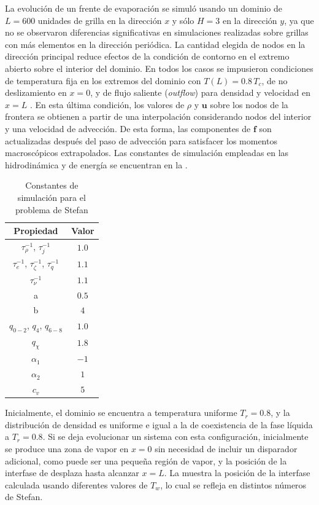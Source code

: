 La evoluci\'on de un frente de evaporaci\'on se simul\'o usando un dominio de $L=600$ unidades de grilla en la direcci\'on $x$ y s\'olo $H=3$ en la direcci\'on $y$, ya que no se observaron diferencias significativas en simulaciones realizadas sobre grillas con m\'as elementos en la direcci\'on peri\'odica. La cantidad elegida de nodos en la direcci\'on principal reduce efectos de la condici\'on de contorno en el extremo abierto sobre el interior del dominio. En todos los casos se impusieron condiciones de temperatura fija en los extremos del dominio con $T(L) = 0.8 \, T_c$, de no deslizamiento en $x=0$, y de flujo saliente (\emph{outflow}) para densidad y velocidad en $x=L$ \cite{lou_evaluation_2013}. En esta \'ultima condici\'on, los valores de $\rho$ y $\bm{u}$ sobre los nodos de la frontera se obtienen a partir de una interpolaci\'on considerando nodos del interior y una velocidad de advecci\'on. De esta forma, las componentes de $\bm{f}$ son actualizadas despu\'es del paso de advecci\'on para satisfacer los momentos macrosc\'opicos extrapolados. Las constantes de simulaci\'on empleadas en las \lbe{} hidrodin\'amica y de energ\'ia se encuentran en la .
\begin{table}[ht]
	\centering
    \begin{tabular}{c c}
	    \toprule
        \bf Propiedad & \bf Valor \\
        \midrule
        $\tau_{\rho}^{-1}$, $\tau_{j}^{-1}$ & $1.0$\\
        $\tau_{e}^{-1}$, $\tau_{\zeta}^{-1}$, $\tau_{q}^{-1}$ & $1.1$ \\
        $\tau_{\nu}^{-1}$ & $1.1$ \\
		a & $0.5$ \\
		b & $4$ \\
		$q_{0-2}$, $q_4$, $q_{6-8}$ & $1.0$ \\
		$q_{\chi}$ & $1.8$ \\
		$\alpha_1$ & $-1$ \\
		$\alpha_2$ & $1$ \\
		$c_v$ & $5$ \\
        \bottomrule
	\end{tabular}
	\caption{Constantes de simulaci\'on para el problema de Stefan}
	\label{tab:stef_2d_prop}
\end{table} 

Inicialmente, el dominio se encuentra a temperatura uniforme $T_r = 0.8$, y la distribuci\'on de densidad es uniforme e igual a la de coexistencia de la fase l\'iquida a $T_r = 0.8$. Si se deja evolucionar un sistema con esta configuraci\'on, inicialmente se produce una zona de vapor en $x=0$ sin necesidad de incluir un disparador adicional, como puede ser una peque\~na regi\'on de vapor, y la posici\'on de la interfase de desplaza hasta alcanzar $x=L$. La  muestra la posici\'on de la interfase calculada usando diferentes valores de $T_w$, lo cual se refleja en distintos n\'umeros de Stefan. 

